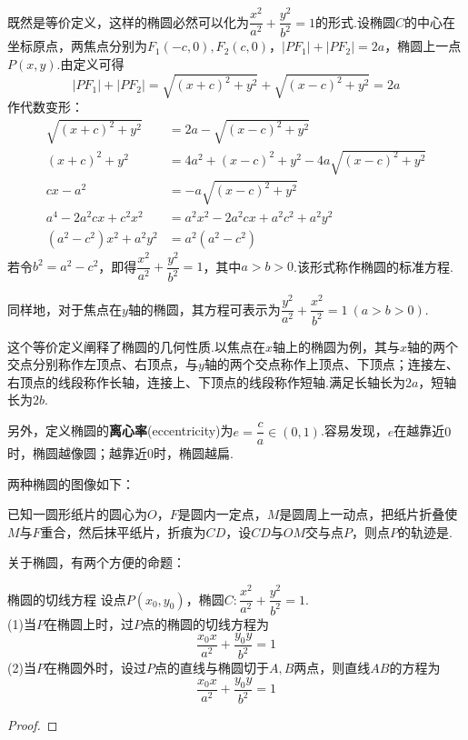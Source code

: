 \documentclass[lang=cn, zihao=5]{elegantbook}
\newcommand{\tk}{\uline{\hspace{4em}}}
\begin{document}
既然是等价定义，这样的椭圆必然可以化为$\dfrac{x^2}{a^2}+\dfrac{y^2}{b^2}=1$的形式.设椭圆$C$的中心在坐标原点，两焦点分别为$F_1(-c,0),F_2(c,0)$，$|PF_1|+|PF_2|=2a$，椭圆上一点$P(x,y)$.由定义可得$$|PF_1|+|PF_2|=\sqrt{(x+c)^2+y^2} + \sqrt{(x-c)^2+y^2} = 2a$$
作代数变形：
\begin{align*}
	\sqrt{(x+c)^2+y^2} &= 2a - \sqrt{(x-c)^2+y^2} \\
	(x+c)^2+y^2 &= 4a^2 + (x-c)^2+y^2 - 4a\sqrt{(x-c)^2+y^2} \\
	cx-a^2 &= -a\sqrt{(x-c)^2+y^2} \\
	a^4 - 2a^2cx + c^2x^2 &= a^2x^2 - 2a^2cx + a^2c^2 + a^2y^2 \\
	(a^2-c^2)x^2+a^2y^2 &= a^2(a^2-c^2)
\end{align*}
若令$b^2=a^2-c^2$，即得$\dfrac{x^2}{a^2}+\dfrac{y^2}{b^2}=1$，其中$a>b>0$.该形式称作椭圆的标准方程.

同样地，对于焦点在$y$轴的椭圆，其方程可表示为$\dfrac{y^2}{a^2}+\dfrac{x^2}{b^2}=1~(a>b>0)$.

这个等价定义阐释了椭圆的几何性质.以焦点在$x$轴上的椭圆为例，其与$x$轴的两个交点分别称作左顶点、右顶点，与$y$轴的两个交点称作上顶点、下顶点；连接左、右顶点的线段称作长轴，连接上、下顶点的线段称作短轴.满足长轴长为$2a$，短轴长为$2b$.

另外，定义椭圆的\textbf{离心率}(eccentricity)为$e=\dfrac{c}{a} \in (0,1)$.容易发现，$e$在越靠近$0$时，椭圆越像圆；越靠近$0$时，椭圆越扁.

两种椭圆的图像如下：


\begin{example}
	已知一圆形纸片的圆心为$O$，$F$是圆内一定点，$M$是圆周上一动点，把纸片折叠使$M$与$F$重合，然后抹平纸片，折痕为$CD$，设$CD$与$OM$交与点$P$，则点$P$的轨迹是\tk .
\end{example}

关于椭圆，有两个方便的命题：

\begin{proposition}{椭圆的切线方程}
	设点$P(x_0,y_0)$，椭圆$C:\dfrac{x^2}{a^2}+\dfrac{y^2}{b^2}=1$. \\
	(1)当$P$在椭圆上时，过$P$点的椭圆的切线方程为$$\frac{x_0x}{a^2} + \frac{y_0y}{b^2} = 1$$
	(2)当$P$在椭圆外时，设过$P$点的直线与椭圆切于$A,B$两点，则直线$AB$的方程为$$\frac{x_0x}{a^2} + \frac{y_0y}{b^2} = 1$$
\end{proposition}
\begin{proof}
	
\end{proof}
\end{document}
